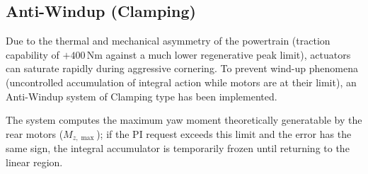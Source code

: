 \documentclass[12pt]{report}
\begin{document}
\subsection{Anti-Windup (Clamping)}
\label{subsec:anti_windup}

Due to the thermal and mechanical asymmetry of the powertrain (traction capability of $+400\,\mathrm{Nm}$ against a much lower regenerative peak limit), actuators can saturate rapidly during aggressive cornering. To prevent wind-up phenomena (uncontrolled accumulation of integral action while motors are at their limit), an Anti-Windup system of Clamping type has been implemented.

The system computes the maximum yaw moment theoretically generatable by the rear motors ($M_{z,\max}$); if the PI request exceeds this limit and the error has the same sign, the integral accumulator is temporarily frozen until returning to the linear region.
\end{document}
